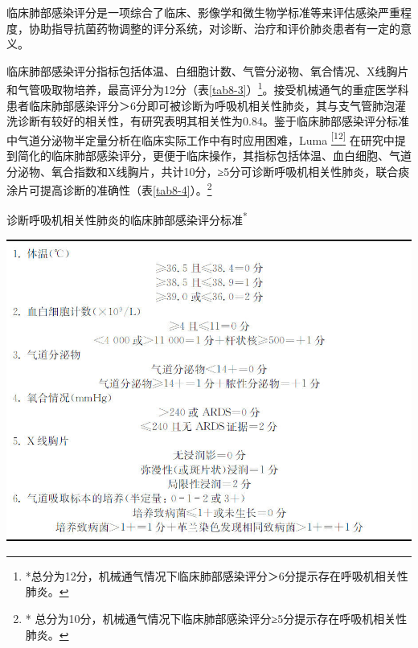 临床肺部感染评分是一项综合了临床、影像学和微生物学标准等来评估感染严重程度，协助指导抗菌药物调整的评分系统，对诊断、治疗和评价肺炎患者有一定的意义。

临床肺部感染评分指标包括体温、白细胞计数、气管分泌物、氧合情况、X线胸片和气管吸取物培养，最高评分为12分（表\ref{tab8-3}）\footnote{*总分为12分，机械通气情况下临床肺部感染评分＞6分提示存在呼吸机相关性肺炎。}。接受机械通气的重症医学科患者临床肺部感染评分＞6分即可被诊断为呼吸机相关性肺炎，其与支气管肺泡灌洗诊断有较好的相关性，有研究表明其相关性为0.84。鉴于临床肺部感染评分标准中气道分泌物半定量分析在临床实际工作中有时应用困难，Luma
\protect\hyperlink{text00014.htmlux5cux23ch12-13}{\textsuperscript{{[}12{]}}}
在研究中提到简化的临床肺部感染评分，更便于临床操作，其指标包括体温、血白细胞、气道分泌物、氧合指数和X线胸片，共计10分，≥5分可诊断呼吸机相关性肺炎，联合痰涂片可提高诊断的准确性（表\ref{tab8-4}）。\footnote{*
总分为10分，机械通气情况下临床肺部感染评分≥5分提示存在呼吸机相关性肺炎。}

\begin{table}[htbp]
\centering
\caption{诊断呼吸机相关性肺炎的临床肺部感染评分标准\textsuperscript{*}}
\label{tab8-3}
\includegraphics{./images/Image00061.jpg}
\end{table}

